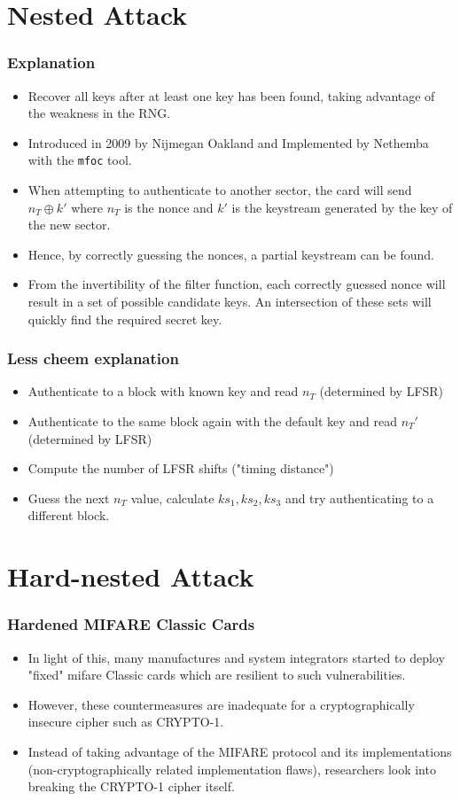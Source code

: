 \documentclass[12pt]{beamer}
\begin{document}
\section{Nested Attack}
\begin{frame}
\frametitle{Explanation}
\begin{itemize}
	\item Recover all keys after at least one key has been found, taking advantage of the weakness in the RNG.
	\item Introduced in 2009 by Nijmegan Oakland and Implemented by Nethemba with the \texttt{mfoc} tool.
	\item When attempting to authenticate to another sector, the card will send $n_T\oplus k'$ where $n_T$ is the nonce and $k'$ is the keystream generated by the key of the new sector.
	\item Hence, by correctly guessing the nonces, a partial keystream can be found.
	\item From the invertibility of the filter function, each correctly guessed nonce will result in a set of possible candidate keys. An intersection of these sets will quickly find the required secret key.
\end{itemize}
\end{frame}

\begin{frame}
\frametitle{Less cheem explanation}
\begin{itemize}
	\item Authenticate to a block with known key and read $n_T$ (determined by LFSR)
	\item Authenticate to the same block again with the default key and read $n_T'$ (determined by LFSR)
	\item Compute the number of LFSR shifts ("timing distance")
	\item Guess the next $n_T$ value, calculate $ks_1, ks_2, ks_3$ and try authenticating to a different block.
\end{itemize}
\end{frame}

\section{Hard-nested Attack}
\begin{frame}
\frametitle{Hardened MIFARE Classic Cards}
\begin{itemize}
	\item In light of this, many manufactures and system integrators started to deploy "fixed" mifare Classic cards which are resilient
	to such vulnerabilities.
	\item However, these countermeasures
	are inadequate for a cryptographically insecure cipher such as CRYPTO-1.
	\item Instead of taking advantage of the MIFARE protocol and its implementations (non-cryptographically related implementation
	flaws), researchers look into breaking the CRYPTO-1 cipher itself.
\end{itemize}
\end{frame}
\end{document}
